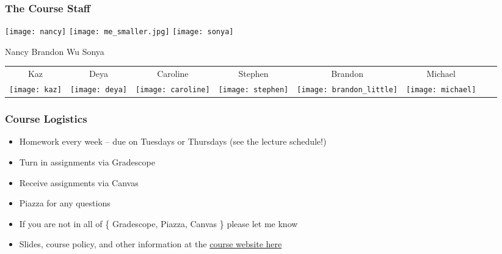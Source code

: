 \documentclass[aspectratio=169]{beamer}
\begin{document}
\begin{frame}[fragile]
    \frametitle{The Course Staff}

    \begin{center} 
      \texttt{[image: nancy]} \qquad \qquad \qquad
      \texttt{[image: me\_smaller.jpg]} \qquad \qquad \qquad
      \texttt{[image: sonya]} 
    \end{center}
    \begin{center} 
      \large Nancy \qquad \qquad \quad
      \Large Brandon Wu \qquad \qquad \quad 
      \large Sonya
    \end{center}
    
    \vspace{\fill}

    \begin{center}\begin{tabular}{c c c c c c c c }
      Kaz & Deya & Caroline & Stephen & Brandon & Michael \\  
      \texttt{[image: kaz]} &
      \texttt{[image: deya]} &
      \texttt{[image: caroline]} &
      \texttt{[image: stephen]} &
      \texttt{[image: brandon\_little]} &
      \texttt{[image: michael]} \\
    \end{tabular}\end{center}
\end{frame}

\begin{frame}[fragile]
  \frametitle{Course Logistics}

  \begin{itemize}
    \item Homework every week -- due on Tuesdays or Thursdays (see the lecture schedule!) 
    \item Turn in assignments via Gradescope
    \item Receive assignments via Canvas
    \item Piazza for any questions
    \item If you are not in all of \{ Gradescope, Piazza, Canvas \} please let me know
    \item Slides, course policy, and other information at the {\color{blue}\href{http://www.cs.cmu.edu/~15150/}{course website here}}
  \end{itemize}
\end{frame}
\end{document}
